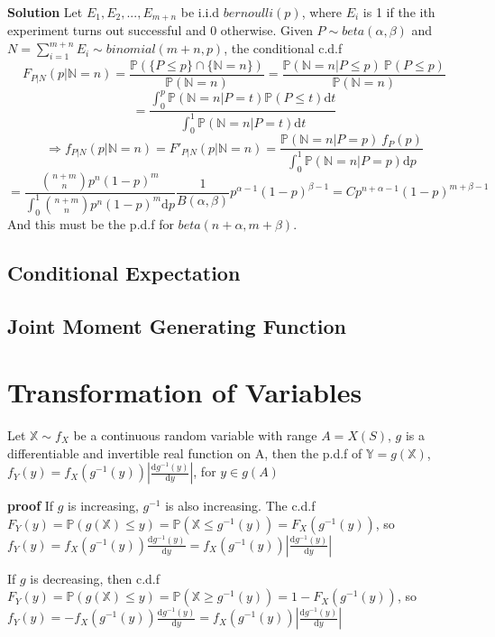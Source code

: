 \documentclass[a4paper,12pt]{article}
\begin{document}
\textbf{Solution}
Let $E_1, E_2, ..., E_{m+n}$ be i.i.d $bernoulli(p)$, where $E_i$ is 1 if the ith experiment turns out successful and 0 otherwise. Given $P \sim beta(\alpha, \beta)$ and $N = \sum_{i=1}^{m+n} E_i \sim binomial(m+n, p)$, the conditional c.d.f 
$$F_{P|N}(p|\mathbb{N}=n) = \frac{\mathbb{P}( \{P \leq p\} \cap \{\mathbb{N} = n\} )}{\mathbb{P}(\mathbb{N} = n)} = \frac{\mathbb{P}( \mathbb{N} = n | P \leq p )\  \mathbb{P}( P \leq p )}{\mathbb{P}(\mathbb{N} = n)} $$
$$= \frac{\int_0^p \mathbb{P} (\mathbb{N} = n | P=t) \mathbb{P}( P \leq t ) \mathrm{d}t }{\int_0^1 \mathbb{P} (\mathbb{N} = n | P=t) \mathrm{d}t }$$
$$\Rightarrow f_{P|N}(p|\mathbb{N}=n) = F'_{P|N}(p|\mathbb{N}=n) =   \frac{\mathbb{P} (\mathbb{N} = n | P=p)\ f_P(p)}{\int_0^1 \mathbb{P} (\mathbb{N} = n | P=p) \mathrm{d}p }$$
$$= \frac{ {n+m \choose n}p^n(1-p)^m }{\int_0^1{ n+m \choose n}p^n(1-p)^m\mathrm{d}p}\frac{1}{B(\alpha,	\beta)} p^{\alpha-1} (1-p)^{\beta-1} = C p^{n+\alpha-1} (1-p)^{m+\beta-1}$$
And this must be the p.d.f for $beta(n+\alpha, m+\beta )$.

\subsection{Conditional Expectation}

\subsection{Joint Moment Generating Function}

\newpage
\section{Transformation of Variables}
Let $\mathbb{X} \sim f_X$ be a continuous random variable with range $A = X(S)$, $g$ is a differentiable and invertible real function on A, then the p.d.f of $\mathbb{Y} = g(\mathbb{X})$, $f_Y(y) = f_X(g^{-1}(y)) |\frac{\mathrm{d}g^{-1}(y)}{\mathrm{d}y} |$, for $y\in g(A)$

\textbf{proof} If $g$ is increasing, $g^{-1}$ is also increasing.  The c.d.f $F_Y(y) = \mathbb{P}( g(\mathbb{X}) \leq y ) = \mathbb{P}( \mathbb{X} \leq g^{-1}(y) ) = F_X( g^{-1}(y) )$, so $f_Y(y) = f_X(g^{-1}(y)) \frac{\mathrm{d}g^{-1}(y)}{\mathrm{d}y} = f_X(g^{-1}(y)) |\frac{\mathrm{d}g^{-1}(y)}{\mathrm{d}y} |$


If $g$ is decreasing, then c.d.f $F_Y(y) = \mathbb{P}( g(\mathbb{X}) \leq y ) = \mathbb{P}( \mathbb{X} \geq g^{-1}(y) ) = 1 - F_X( g^{-1}(y) )$, so $f_Y(y) = -f_X(g^{-1}(y)) \frac{\mathrm{d}g^{-1}(y)}{\mathrm{d}y}  = f_X(g^{-1}(y)) |\frac{\mathrm{d}g^{-1}(y)}{\mathrm{d}y} |$ 
\end{document}
